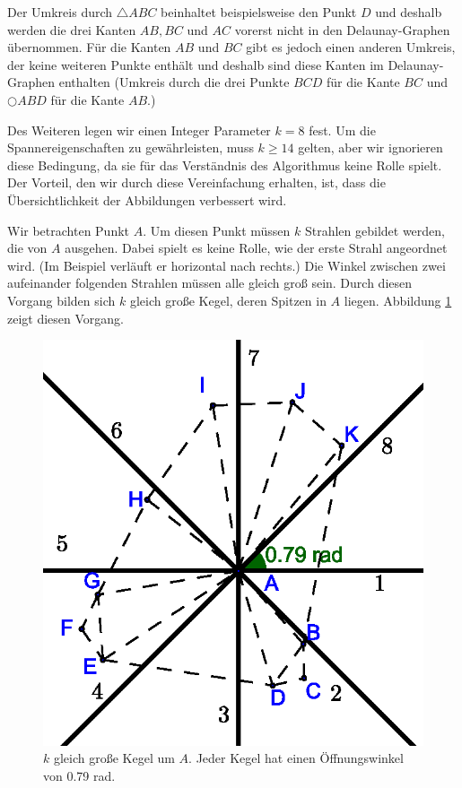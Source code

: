 \documentclass[a4paper,twoside]{IEEEtran}
\begin{document}
Der Umkreis durch $\triangle{ABC} $ beinhaltet beispielsweise den Punkt $D $ und deshalb werden die drei Kanten $AB, BC $ und $AC $ vorerst nicht in den Delaunay-Graphen übernommen.
Für die Kanten $AB $ und $BC $ gibt es jedoch einen anderen Umkreis, der keine weiteren Punkte enthält und deshalb sind diese Kanten im Delaunay-Graphen enthalten (Umkreis durch die drei Punkte $BCD $ für die Kante $BC $ und  $\bigcirc{ABD} $ für die Kante $AB $.)

Des Weiteren legen wir einen Integer Parameter $k=8 $ fest.
Um die Spannereigenschaften zu gewährleisten, muss $k \geq 14 $ gelten, aber wir ignorieren diese Bedingung, da sie für das Verständnis des Algorithmus keine Rolle spielt.
Der Vorteil, den wir durch diese Vereinfachung erhalten, ist, dass die Übersichtlichkeit der Abbildungen verbessert wird.

Wir betrachten Punkt $A $.
Um diesen Punkt müssen $k $ Strahlen gebildet werden, die von $A $ ausgehen.
Dabei spielt es keine Rolle, wie der erste Strahl angeordnet wird. (Im Beispiel verläuft er horizontal nach rechts.)
Die Winkel zwischen zwei aufeinander folgenden Strahlen müssen alle gleich groß sein.
Durch diesen Vorgang bilden sich $k $ gleich große Kegel, deren Spitzen in $A $ liegen.
Abbildung \ref{fig:cones} zeigt diesen Vorgang.

\begin{figure}[h!]
\centering
\includegraphics[width=0.7\linewidth]{cones.eps}
\caption{$k $ gleich große Kegel um $A $. Jeder Kegel hat einen Öffnungswinkel von 0.79 rad.}
\label{fig:cones}
\end{figure}
\end{document}
